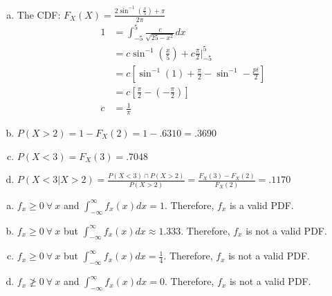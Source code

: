 \documentclass[12pt]{article}
\newenvironment{problem}[2][Problem]{\begin{trivlist}
\item[\hskip \labelsep {\bfseries #1}\hskip \labelsep {\bfseries #2.}]
  \vspace{1 cm}
}{\end{trivlist}}
\begin{document}
\begin{problem}{3.15}
\item
  \begin{enumerate}[a.]
    \item %
      The CDF: $F_X(X) = \frac{2\sin^{-1}(\frac{x}{5})+\pi}{2\pi}$
      \begin{align*}
        1 &= \int_{-5}^5 \frac{c}{\sqrt{25-x^2}}dx \\
        &= c\sin^{-1}\left( \frac{x}{5} \right) + c\frac{\pi}{2}\big|_{-5}^5 \\
        &= c\left[ \sin^{-1}(1) + \frac{\pi}{2} - \sin^{-1} - \frac{pi}{2} \right] \\
        &= c\left[ \frac{\pi}{2} - (-\frac{\pi}{2})\right] \\
        c &= \frac{1}{\pi}
      \end{align*}
    \item %
      $P(X>2) = 1 - F_X(2) = 1 - .6310 = .3690$
    \item %
      $P(X<3) = F_X(3) = .7048$
    \item %
      $P(X < 3|X>2) = \frac{P(X<3)\cap P(X>2)}{P(X>2)}
      = \frac{F_X(3) - F_X(2)}{F_X(2)} = .1170$
  \end{enumerate}
\end{problem}

\begin{problem}{3.17}
\item
  \begin{enumerate}[a.]
    \item %
      $f_x \geq 0 \ \forall \ x$ and $\int_{-\infty}^{\infty} f_x(x)dx = 1$.
      Therefore, $f_x$ is a valid PDF.
    \item %
      $f_x \geq 0 \ \forall \ x$ but $\int_{-\infty}^{\infty} f_x(x)dx \approx 1.333$.
      Therefore, $f_x$ is not a valid PDF.
    \item %
      $f_x \geq 0 \ \forall \ x$ but $\int_{-\infty}^{\infty} f_x(x)dx =
      \frac{1}{4}$. Therefore, $f_x$ is not a valid PDF.
    \item %
      $f_x \ngeq 0 \ \forall \ x$ and $\int_{-\infty}^{\infty} f_x(x)dx = 0$.
      Therefore, $f_x$ is not a valid PDF.
  \end{enumerate}
\end{problem}
\end{document}
